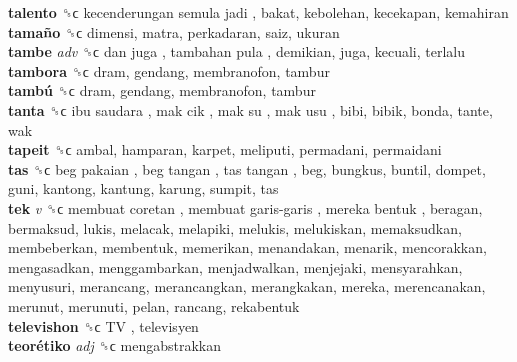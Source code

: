 \textbf{talento} ␝ϲ   kecenderungan semula jadi , bakat, kebolehan, kecekapan, kemahiran  \\
\textbf{tamaño} ␝ϲ  dimensi, matra, perkadaran, saiz, ukuran  \\
\textbf{tambe} \emph{adv}  ␝ϲ   dan juga ,  tambahan pula , demikian, juga, kecuali, terlalu  \\
\textbf{tambora} ␝ϲ  dram, gendang, membranofon, tambur  \\
\textbf{tambú} ␝ϲ  dram, gendang, membranofon, tambur  \\
\textbf{tanta} ␝ϲ   ibu saudara ,  mak cik ,  mak su ,  mak usu , bibi, bibik, bonda, tante, wak  \\
\textbf{tapeit} ␝ϲ  ambal, hamparan, karpet, meliputi, permadani, permaidani  \\
\textbf{tas} ␝ϲ   beg pakaian ,  beg tangan ,  tas tangan , beg, bungkus, buntil, dompet, guni, kantong, kantung, karung, sumpit, tas  \\
\textbf{tek} \emph{v}  ␝ϲ   membuat coretan ,  membuat garis-garis ,  mereka bentuk , beragan, bermaksud, lukis, melacak, melapiki, melukis, melukiskan, memaksudkan, membeberkan, membentuk, memerikan, menandakan, menarik, mencorakkan, mengasadkan, menggambarkan, menjadwalkan, menjejaki, mensyarahkan, menyusuri, merancang, merancangkan, merangkakan, mereka, merencanakan, merunut, merunuti, pelan, rancang, rekabentuk  \\
\textbf{televishon} ␝ϲ   TV , televisyen  \\
\textbf{teorétiko} \emph{adj}  ␝ϲ  mengabstrakkan  \\
